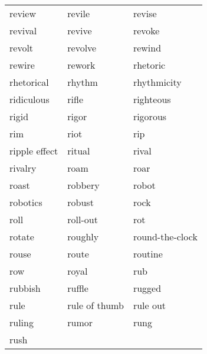 \documentclass{minimal}
\begin{document}
\begin{longtable}{p{2.7cm}@{\hskip 0.2cm}p{2.7cm}@{\hskip 0.2cm}p{2.7cm}}
review & revile & revise \\
revival & revive & revoke \\
revolt & revolve & rewind \\
rewire & rework & rhetoric \\
rhetorical & rhythm & rhythmicity \\
ridiculous & rifle & righteous \\
rigid & rigor & rigorous \\
rim & riot & rip \\
ripple effect & ritual & rival \\
rivalry & roam & roar \\
roast & robbery & robot \\
robotics & robust & rock \\
roll & roll-out & rot \\
rotate & roughly & round-the-clock \\
rouse & route & routine \\
row & royal & rub \\
rubbish & ruffle & rugged \\
rule & rule of thumb & rule out \\
ruling & rumor & rung \\
rush
\end{longtable}
\end{document}

